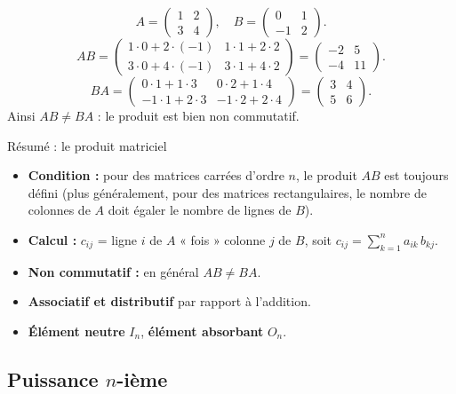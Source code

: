 \begin{exemple}
	\[
	A=\begin{pmatrix}1&2\\3&4\end{pmatrix},\quad
	B=\begin{pmatrix}0&1\\-1&2\end{pmatrix}.
	\]
	\[
	AB = \begin{pmatrix}1\cdot0+2\cdot(-1) & 1\cdot1+2\cdot2\\
		3\cdot0+4\cdot(-1) & 3\cdot1+4\cdot2\end{pmatrix}
	= \begin{pmatrix}-2&5\\-4&11\end{pmatrix}.
	\]
	\[
	BA = \begin{pmatrix}0\cdot1+1\cdot3 & 0\cdot2+1\cdot4\\
		-1\cdot1+2\cdot3 & -1\cdot2+2\cdot4\end{pmatrix}
	= \begin{pmatrix}3&4\\5&6\end{pmatrix}.
	\]
	Ainsi $AB \neq BA$ : le produit est bien non commutatif.
\end{exemple}

\begin{propriete}{Résumé : le produit matriciel}{}
	\begin{itemize}[label=\textbullet]
		\item \textbf{Condition :} pour des matrices carrées d'ordre $n$, le produit $AB$
		est toujours défini (plus généralement, pour des matrices rectangulaires,
		le nombre de colonnes de $A$ doit égaler le nombre de lignes de $B$).
		\item \textbf{Calcul :} $c_{ij}$ = ligne $i$ de $A$ « fois » colonne $j$ de $B$,
		soit $c_{ij} = \sum_{k=1}^n a_{ik}\,b_{kj}$.
		\item \textbf{Non commutatif :} en général $AB \neq BA$.
		\item \textbf{Associatif et distributif} par rapport à l'addition.
		\item \textbf{Élément neutre} $I_n$, \textbf{élément absorbant} $O_n$.
	\end{itemize}
\end{propriete}

\subsection{Puissance $n$-ième}

